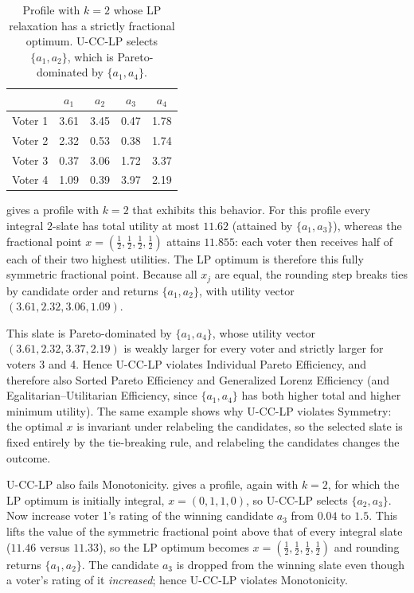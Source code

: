 \documentclass[letterpaper]{article} %
\newcommand{\LP}{\textsc{U-CC-LP}}
\begin{document}
\begin{table}[t]
\centering
\begin{tabular}{l|cccc}
\hline
 & $a_1$ & $a_2$ & $a_3$ & $a_4$ \\
\hline
Voter 1 & 3.61 & 3.45 & 0.47 & 1.78 \\
Voter 2 & 2.32 & 0.53 & 0.38 & 1.74 \\
Voter 3 & 0.37 & 3.06 & 1.72 & 3.37 \\
Voter 4 & 1.09 & 0.39 & 3.97 & 2.19 \\
\hline
\end{tabular}
\caption{Profile with $k=2$ whose LP relaxation has a strictly fractional optimum.
\LP{} selects $\{a_1,a_2\}$, which is Pareto-dominated by $\{a_1,a_4\}$.}
\label{tab:lp-fractional}
\end{table}

 gives a profile with $k=2$ that exhibits this behavior.
For this profile every integral $2$-slate has total utility at most $11.62$ (attained by $\{a_1,a_3\}$), whereas the fractional point $x=(\tfrac12,\tfrac12,\tfrac12,\tfrac12)$ attains $11.855$: each voter then receives half of each of their two highest utilities.
The LP optimum is therefore this fully symmetric fractional point.
Because all $x_j$ are equal, the rounding step breaks ties by candidate order and returns $\{a_1,a_2\}$, with utility vector $(3.61,2.32,3.06,1.09)$.

This slate is Pareto-dominated by $\{a_1,a_4\}$, whose utility vector $(3.61,2.32,3.37,2.19)$ is weakly larger for every voter and strictly larger for voters 3 and 4.
Hence \LP{} violates Individual Pareto Efficiency, and therefore also Sorted Pareto Efficiency and Generalized Lorenz Efficiency (and Egalitarian--Utilitarian Efficiency, since $\{a_1,a_4\}$ has both higher total and higher minimum utility).
The same example shows why \LP{} violates Symmetry: the optimal $x$ is invariant under relabeling the candidates, so the selected slate is fixed entirely by the tie-breaking rule, and relabeling the candidates changes the outcome.

\LP{} also fails Monotonicity.
 gives a profile, again with $k=2$, for which the LP optimum is initially integral, $x=(0,1,1,0)$, so \LP{} selects $\{a_2,a_3\}$.
Now increase voter 1's rating of the winning candidate $a_3$ from $0.04$ to $1.5$.
This lifts the value of the symmetric fractional point above that of every integral slate ($11.46$ versus $11.33$), so the LP optimum becomes $x=(\tfrac12,\tfrac12,\tfrac12,\tfrac12)$ and rounding returns $\{a_1,a_2\}$.
The candidate $a_3$ is dropped from the winning slate even though a voter's rating of it \emph{increased}; hence \LP{} violates Monotonicity.
\end{document}
